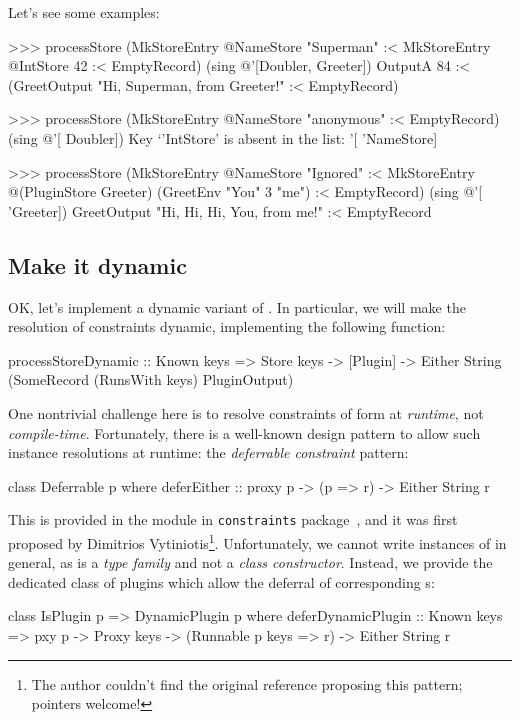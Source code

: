 \documentclass[demotion-paper.tex]{subfiles}
\begin{document}
Let's see some examples:
\begin{repl}
>>> processStore 
      (MkStoreEntry @NameStore "Superman" :< MkStoreEntry @IntStore 42
        :< EmptyRecord)
      (sing @'[Doubler, Greeter])
OutputA 84 :< (GreetOutput "Hi, Superman, from Greeter!" :< EmptyRecord)

>>> processStore (MkStoreEntry @NameStore "anonymous" :< EmptyRecord) 
      (sing @'[ Doubler])
Key `'IntStore' is absent in the list: '[ 'NameStore]

>>> processStore 
      (MkStoreEntry @NameStore "Ignored"
        :< MkStoreEntry @(PluginStore Greeter) (GreetEnv "You" 3 "me")
        :< EmptyRecord) (sing @'[ 'Greeter])
GreetOutput "Hi, Hi, Hi, You, from me!" :< EmptyRecord
\end{repl}

\subsection{Make it dynamic}
OK, let's implement a dynamic variant of .
In particular, we will make the resolution of  constraints dynamic, implementing the following function:

\begin{code}
processStoreDynamic
  :: Known keys
  => Store keys -> [Plugin]
  -> Either String (SomeRecord (RunsWith keys) PluginOutput)
\end{code}

One nontrivial challenge here is to resolve constraints of form  at \emph{runtime}, not \emph{compile-time}.
Fortunately, there is a well-known design pattern to allow such instance resolutions at runtime: the \emph{deferrable constraint} pattern:
\begin{code}
class Deferrable p where
  deferEither :: proxy p -> (p => r) -> Either String r
\end{code}
This is provided in the module  in \texttt{constraints} package~\cite{Kmett:2020ab}, and it was first proposed by Dimitrios Vytiniotis\footnote{The author couldn't find the original reference proposing this pattern; pointers welcome!}.
Unfortunately, we cannot write instances of  in general, as  is a \emph{type family} and not a \emph{class constructor}.
Instead, we provide the dedicated class  of plugins which allow the deferral of corresponding s:
\begin{code}
class IsPlugin p => DynamicPlugin p where
  deferDynamicPlugin
    :: Known keys
    => pxy p -> Proxy keys -> (Runnable p keys => r) -> Either String r
\end{code}
\end{document}
